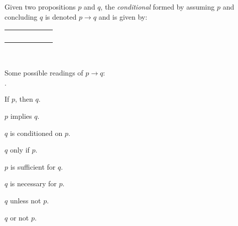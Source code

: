 \begin{definition}
    \begin{minipage}[t]{.55\linewidth}
        Given two propositions $p$ and $q$,
        the \emph{conditional} formed by assuming $p$ and concluding $q$
        is denoted $p \rightarrow q$ and is given by:
        \begin{table}[H]
            \centering
            \label{tab:implies}
            \begin{tabular}{|CcCc||Cc|} \hline
                 &  &  \\ \hline
                \thead{$\top$} & \thead{$\top$} &  \\
                \thead{$\top$} & \thead{$\bot$} &  \\
                \thead{$\bot$} & \thead{$\top$} &  \\
                \thead{$\bot$} & \thead{$\bot$} &  \\ \hline
            \end{tabular}
        \end{table}
    \end{minipage}%
    \begin{minipage}[t]{.05\linewidth}
        ~
    \end{minipage}%
    \begin{minipage}[t]{.4\linewidth}
        Some possible readings of $p \rightarrow q$:\\
        \begin{list}{$\cdot$}{}
            \item
                If $p$, then $q$.
            \item
                $p$ implies $q$.
            \item
                $q$ is conditioned on $p$.
            \item
                $q$ only if $p$.
            \item
                $p$ is sufficient for $q$.
            \item
                $q$ is necessary for $p$.
            \item
                $q$ unless not $p$.
            \item
                $q$ or not $p$.
        \end{list}
    \end{minipage}
\end{definition}

